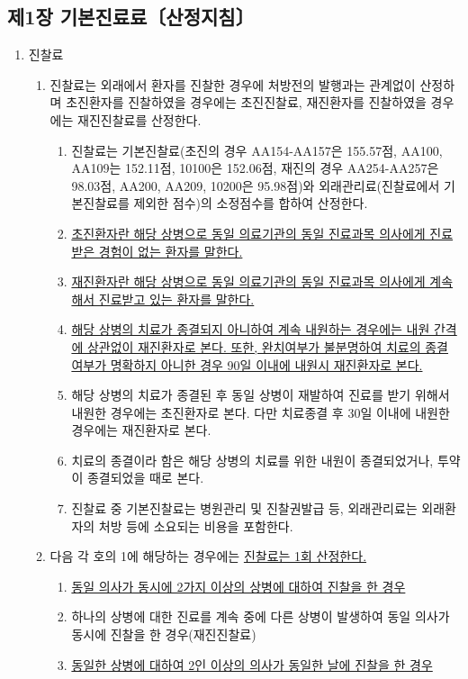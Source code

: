 \subsection{제1장 기본진료료〔산정지침〕}
\begin{enumerate}[1.]\tightlist
\item 진찰료
	\begin{enumerate}[가.]\tightlist
	\item 진찰료는 외래에서 환자를 진찰한 경우에 처방전의 발행과는 관계없이 산정하며 초진환자를 진찰하였을 경우에는 초진진찰료, 재진환자를 진찰하였을 경우에는 재진진찰료를 산정한다.
		\begin{enumerate}[(1)]\tightlist
		\item 진찰료는 기본진찰료(초진의 경우 AA154-AA157은 155.57점, AA100, AA109는 152.11점, 10100은 152.06점, 재진의 경우 AA254-AA257은 98.03점, AA200, AA209, 10200은 95.98점)와
외래관리료(진찰료에서 기본진찰료를 제외한 점수)의 소정점수를 합하여 산정한다.
		\item \uline{초진환자란 해당 상병으로 동일 의료기관의 동일 진료과목 의사에게 진료받은 경험이 없는 환자를 말한다.}
		\item \uline{재진환자란 해당 상병으로 동일 의료기관의 동일 진료과목 의사에게 계속해서 진료받고 있는 환자를 말한다.}
		\item \uline{해당 상병의 치료가 종결되지 아니하여 계속 내원하는 경우에는 내원 간격에 상관없이 재진환자로 본다. 또한, 완치여부가 불분명하여 치료의 종결 여부가 명확하지 아니한 경우 90일 이내에 내원시 재진환자로 본다.}
		\item 해당 상병의 치료가 종결된 후 동일 상병이 재발하여 진료를 받기 위해서 내원한 경우에는 초진환자로 본다. 다만 치료종결 후 30일 이내에 내원한 경우에는 재진환자로 본다.
		\item 치료의 종결이라 함은 해당 상병의 치료를 위한 내원이 종결되었거나, 투약이 종결되었을 때로 본다.
		\item 진찰료 중 기본진찰료는 병원관리 및 진찰권발급 등, 외래관리료는 외래환자의 처방 등에 소요되는 비용을 포함한다.
		\end{enumerate}
	\item 다음 각 호의 1에 해당하는 경우에는 \uline{진찰료는 1회 산정한다.}
		\begin{enumerate}[(1)]\tightlist
		\item \uline{동일 의사가 동시에 2가지 이상의 상병에 대하여 진찰을 한 경우}
		\item 하나의 상병에 대한 진료를 계속 중에 다른 상병이 발생하여 동일 의사가 동시에 진찰을 한 경우(재진진찰료)
		\item \uline{동일한 상병에 대하여 2인 이상의 의사가 동일한 날에 진찰을 한 경우}

\end{enumerate}
\end{enumerate}
\end{enumerate}
